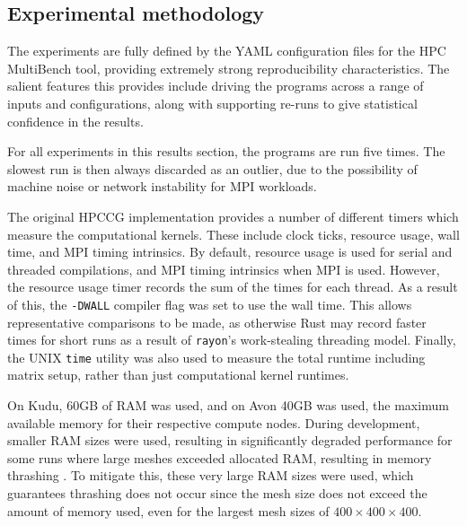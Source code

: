 \subsection{Experimental methodology}
\label{ssec:experimental-methodology}


The experiments are fully defined by the YAML configuration files for the HPC MultiBench tool, providing extremely strong reproducibility characteristics. The salient features this provides include driving the programs across a range of inputs and configurations, along with supporting re-runs to give statistical confidence in the results.

For all experiments in this results section, the programs are run five times. The slowest run is then always discarded as an outlier, due to the possibility of machine noise or network instability for MPI workloads.

The original \acrshort{HPCCG} implementation provides a number of different timers which measure the computational kernels. These include clock ticks, resource usage, wall time, and MPI timing intrinsics. By default, resource usage is used for serial and threaded compilations, and MPI timing intrinsics when MPI is used. However, the resource usage timer records the sum of the times for each thread. As a result of this, the \texttt{-DWALL} compiler flag was set to use the wall time. This allows representative comparisons to be made, as otherwise Rust may record faster times for short runs as a result of \texttt{rayon}'s work-stealing threading model. Finally, the UNIX \texttt{time} utility was also used to measure the total runtime including matrix setup, rather than just computational kernel runtimes.

On Kudu, 60GB of RAM was used, and on Avon 40GB was used, the maximum available memory for their respective compute nodes. During development, smaller RAM sizes were used, resulting in significantly degraded performance for some runs where large meshes exceeded allocated RAM, resulting in memory thrashing \cite{pattersonHennessyComputerOrganisationArchitecture}. To mitigate this, these very large RAM sizes were used, which guarantees thrashing does not occur since the mesh size does not exceed the amount of memory used, even for the largest mesh sizes of $400 \times 400 \times 400$.


